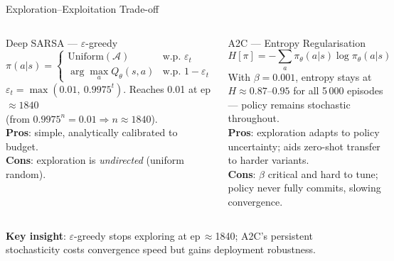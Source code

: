 \documentclass[aspectratio=169, 10pt]{beamer}
\newcommand{\highlight}[1]{{\color{gold}\textbf{#1}}}
\begin{document}
\begin{frame}{Exploration--Exploitation Trade-off}
  \begin{columns}[T]
      \begin{block}{Deep SARSA --- $\varepsilon$-greedy}
        \[
          \pi(a|s) = \begin{cases}
            \text{Uniform}(\mathcal{A}) & \text{w.p. } \varepsilon_t\\
            \arg\max_a Q_\theta(s,a)    & \text{w.p. } 1-\varepsilon_t
          \end{cases}
        \]
        $\varepsilon_t = \max(0.01,\ 0.9975^t)$.
        Reaches 0.01 at ep\,$\approx\!1840$\\
        (from $0.9975^n = 0.01 \Rightarrow n \approx 1840$).\\[0.4em]
        \textbf{Pros}: simple, analytically calibrated to budget.\\
        \textbf{Cons}: exploration is \emph{undirected} (uniform random).
      \end{block}
      \begin{block}{A2C --- Entropy Regularisation}
        \[
          H[\pi] = -\sum_a \pi_\theta(a|s)\log\pi_\theta(a|s)
        \]
        With $\beta=0.001$, entropy stays at $H\!\approx\!0.87$--$0.95$
        for all 5\,000 episodes --- policy remains stochastic throughout.\\[0.4em]
        \textbf{Pros}: exploration adapts to policy uncertainty;
        aids zero-shot transfer to harder variants.\\
        \textbf{Cons}: $\beta$ critical and hard to tune; policy
        never fully commits, slowing convergence.
      \end{block}
  \end{columns}
  \vspace{0.4em}
  \begin{center}
    \highlight{Key insight}: $\varepsilon$-greedy stops exploring at ep\,$\approx$1840;
    A2C's persistent stochasticity costs convergence speed but gains deployment robustness.
  \end{center}
\end{frame}
\end{document}
